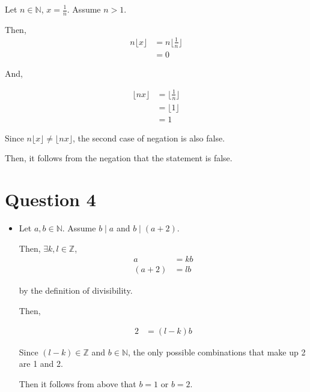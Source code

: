 \documentclass[12pt]{article}
\begin{document}
\begin{enumerate}[a.]
    Let $n \in \mathbb{N}$, $x = \frac{1}{n}$. Assume $n > 1$.

    \bigskip

    Then,
    \setcounter{equation}{0}
    \begin{align}
        n \lfloor x \rfloor &= n \lfloor \frac{1}{n} \rfloor\\
        &= 0
    \end{align}

    And,

    \begin{align}
        \lfloor nx \rfloor &= \lfloor \frac{1}{n} \rfloor\\
        &= \lfloor 1 \rfloor\\
        &= 1
    \end{align}

    Since $n\lfloor x \rfloor \neq \lfloor nx \rfloor$, the second case of negation
    is also false.

    \bigskip

    Then, it follows from the negation that the statement is false.

\end{enumerate}

\section*{Question 4}
\begin{itemize}
    \item

    Let $a,b \in \mathbb{N}$. Assume $b \mid a$ and $b \mid (a + 2)$.

    \bigskip

    Then, $\exists k,l \in \mathbb{Z}$,
    \setcounter{equation}{0}
    \begin{align}
        a &= kb\\
        (a + 2) &= lb
    \end{align}

    by the definition of divisibility.

    \bigskip

    Then,

    \begin{align}
        2 &= (l - k)b
    \end{align}

    \bigskip

    Since $(l - k) \in \mathbb{Z}$ and $b \in \mathbb{N}$, the only possible
    combinations that make up 2 are 1 and 2.

    \bigskip

    Then it follows from above that $b = 1$ or $b = 2$.
\end{itemize}
\end{document}
